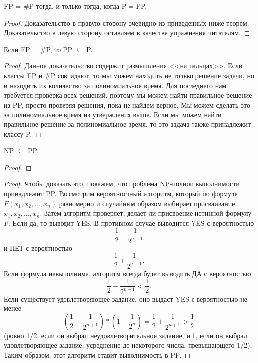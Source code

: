     
    \begin{Thm}
         FP = \#P тогда, и только тогда, когда P = PP.
    \end{Thm}
    \begin{proof}
        Доказательство в правую сторону очевидно из приведенных ниже теорем.\\
        Доказательство в левую сторону оставляем в качестве упражнения читателям.
    \end{proof}
    \begin{Thm}
        Если FP = \#P, то PP $\subseteq$ P.
    \end{Thm}
    \begin{proof}
        Данное доказательство содержит размышления <<на пальцах>>. Если классы FP и \#P совпадают, то мы можем находить не только решение задачи, но и находить их количество за полиномиальное время. Для последнего нам требуется проверка всех решений, поэтому мы можем найти правильное решение из PP, просто проверяя решения, пока не найдем верное. Мы можем сделать это за полиномиальное время из утверждения выше. Если мы можем найти правильное решение за полиномиальное время, то это задача также принадлежит классу P.
    \end{proof}
    
    
    \begin{Thm}
        NP $\subseteq$ PP.
    \end{Thm}
    \begin{proof}
    \end{proof}
    \begin{proof}
        Чтобы доказать это, покажем, что проблема NP-полной выполнимости принадлежит PP. Рассмотрим вероятностный алгоритм, который по формуле $F(x_1, x_2, ..., x_n)$ равномерно и случайным образом выбирает присваивание $x_1, x_2, ..., x_n$. Затем алгоритм проверяет, делает ли присвоение истинной формулу $F$. Если да, то выводит YES. В противном случае выводится YES с вероятностью $$\frac{1}{2} - \frac{1}{2^{n+1}}$$ и НЕТ с вероятностью $$\frac{1}{2} + \frac{1}{2^{n+1}}.$$
        Если формула невыполнима, алгоритм всегда будет выводить ДА с вероятностью $$\frac{1}{2} - \frac{1}{2^{n+1}} < \frac{1}{2}.$$ Если существует удовлетворяющее задание, оно выдаст YES с вероятностью не менее $$(\frac{1}{2} - \frac{1}{2^{n+1}}) * (1 - \frac{1}{2^n}) = \frac{1}{2} + \frac{1}{2^{n+1}} > \frac{1}{2}$$ (ровно 1/2, если он выбрал неудовлетворительное задание, и 1, если он выбрал удовлетворяющее задание, усреднение до некоторого числа, превышающего 1/2). Таким образом, этот алгоритм ставит выполнимость в PP. 
    \end{proof}

